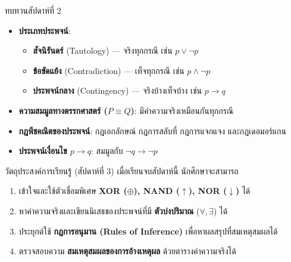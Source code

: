 
\begin{frame}[plain]
  \maketitle
\end{frame}

\begin{frame}{ทบทวนสัปดาห์ที่ 2}
  \begin{itemize}
    \item \textbf{ประเภทประพจน์}:
          \begin{itemize}
            \item \textbf{สัจนิรันดร์} (Tautology) — จริงทุกกรณี เช่น $p \lor \neg p$
            \item \textbf{ข้อขัดแย้ง} (Contradiction) — เท็จทุกกรณี เช่น $p \land \neg p$
            \item \textbf{ประพจน์กลาง} (Contingency) — จริงบ้างเท็จบ้าง เช่น $p \rightarrow q$
          \end{itemize}
    \item \textbf{ความสมมูลทางตรรกศาสตร์ ($P \equiv Q$)}: มีค่าความจริงเหมือนกันทุกกรณี
    \item \textbf{กฎพีชคณิตของประพจน์}: กฎเอกลักษณ์ กฎการสลับที่ กฎการแจกแจง และกฎเดอมอร์แกน
    \item \textbf{ประพจน์เงื่อนไข $p \rightarrow q$}: สมมูลกับ $\neg q \rightarrow \neg p$
  \end{itemize}
\end{frame}

\begin{frame}{วัตถุประสงค์การเรียนรู้ (สัปดาห์ที่ 3)}
  เมื่อเรียนจบสัปดาห์นี้ นักศึกษาจะสามารถ
  \begin{enumerate}
    \item เข้าใจและใช้ตัวเชื่อมพิเศษ \textbf{XOR ($\oplus$), NAND ($\uparrow$), NOR ($\downarrow$)} ได้
    \item หาค่าความจริงและเขียนนิเสธของประพจน์ที่มี \textbf{ตัวบ่งปริมาณ} ($\forall, \exists$) ได้
    \item ประยุกต์ใช้ \textbf{กฎการอนุมาน (Rules of Inference)} เพื่อหาผลสรุปที่สมเหตุสมผลได้
    \item ตรวจสอบความ \textbf{สมเหตุสมผลของการอ้างเหตุผล} ด้วยตารางค่าความจริงได้
  \end{enumerate}
\end{frame}

